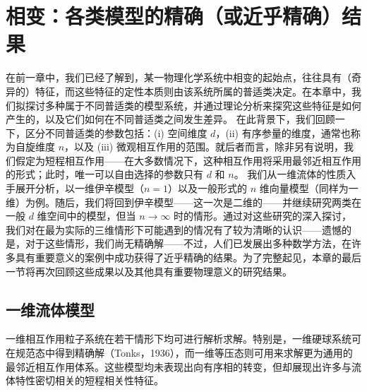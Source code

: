 ﻿\chapter{相变：各类模型的精确（或近乎精确）结果}\label{ux76f8ux53d8ux5404ux7c7bux6a21ux578bux7684ux7cbeux786eux6216ux8fd1ux4e4eux7cbeux786eux7ed3ux679c}
在前一章中，我们已经了解到，某一物理化学系统中相变的起始点，往往具有（奇异的）特征，而这些特征的定性本质则由该系统所属的普适类决定。在本章中，我们拟探讨多种属于不同普适类的模型系统，并通过理论分析来探究这些特征是如何产生的，以及它们如何在不同普适类之间发生差异。
在此背景下，我们回顾一下，区分不同普适类的参数包括：(i) 空间维度 \(d\)，(ii) 有序参量的维度，通常也称为自旋维度 \(n\)，以及 (iii) 微观相互作用的范围。就后者而言，除非另有说明，我们假定为短程相互作用——在大多数情况下，这种相互作用将采用最邻近相互作用的形式；此时，唯一可以自由选择的参数只有 \(d\) 和 \(n\)。
我们从一维流体的性质入手展开分析，以一维伊辛模型（\(n=1\)）以及一般形式的 \(n\) 维向量模型（同样为一维）为例。随后，我们将回到伊辛模型——这一次是二维的——并继续研究两类在一般 \(d\) 维空间中的模型，但当 \(n\to\infty\) 时的情形。通过对这些研究的深入探讨，我们对在最为实际的三维情形下可能遇到的情况有了较为清晰的认识——遗憾的是，对于这些情形，我们尚无精确解——不过，人们已发展出多种数学方法，在许多具有重要意义的案例中成功获得了近乎精确的结果。为了完整起见，本章的最后一节将再次回顾这些成果以及其他具有重要物理意义的研究结果。
\section{一维流体模型}\label{ux4e00ux7ef4ux6d41ux4f53ux6a21ux578b}
一维相互作用粒子系统在若干情形下均可进行解析求解。特别是，一维硬球系统可在规范态中得到精确解（Tonks，1936），而一维等压态则可用来求解更为通用的最邻近相互作用体系。这些模型均未表现出向有序相的转变，但却展现出许多与流体特性密切相关的短程相关性特征。
